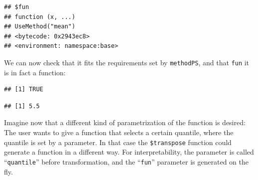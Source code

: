 \documentclass[]{article}
\newenvironment{Shaded}{\begin{snugshade}}{\end{snugshade}}
\newcommand{\CommentTok}[1]{\textcolor[rgb]{0.56,0.35,0.01}{\textit{#1}}}
\newcommand{\ControlFlowTok}[1]{\textcolor[rgb]{0.13,0.29,0.53}{\textbf{#1}}}
\newcommand{\DataTypeTok}[1]{\textcolor[rgb]{0.13,0.29,0.53}{#1}}
\newcommand{\DecValTok}[1]{\textcolor[rgb]{0.00,0.00,0.81}{#1}}
\newcommand{\KeywordTok}[1]{\textcolor[rgb]{0.13,0.29,0.53}{\textbf{#1}}}
\newcommand{\NormalTok}[1]{#1}
\newcommand{\OperatorTok}[1]{\textcolor[rgb]{0.81,0.36,0.00}{\textbf{#1}}}
\newcommand{\StringTok}[1]{\textcolor[rgb]{0.31,0.60,0.02}{#1}}
\renewenvironment{Shaded} {\begin{snugshade}\small} {\end{snugshade}}
\begin{document}
\begin{verbatim}
## $fun
## function (x, ...) 
## UseMethod("mean")
## <bytecode: 0x2943ec8>
## <environment: namespace:base>
\end{verbatim}

We can now check that it fits the requirements set by \texttt{methodPS}, and that \texttt{fun} it is in fact a function:

\begin{Shaded}
\end{Shaded}

\begin{verbatim}
## [1] TRUE
\end{verbatim}

\begin{Shaded}
\end{Shaded}

\begin{verbatim}
## [1] 5.5
\end{verbatim}

Imagine now that a different kind of parametrization of the function is desired:
The user wants to give a function that selects a certain quantile, where the quantile is set by a parameter.
In that case the \texttt{\$transpose} function could generate a function in a different way.
For interpretability, the parameter is called ``\texttt{quantile}'' before transformation, and the ``\texttt{fun}'' parameter is generated on the fly.

\begin{Shaded}
\end{Shaded}
\end{document}

